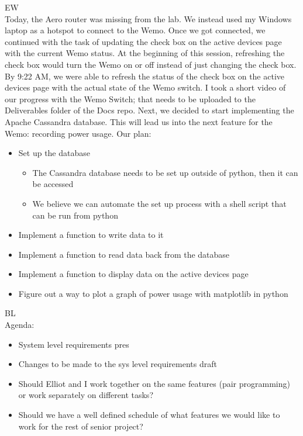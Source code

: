 \documentclass[fontsize=11pt, %
                             paper=letter, %
                             openany, %
                             captions=tableheading,
                             index=totoc,
                             hyperref]{labbook}
\begin{document}
EW\\
Today, the Aero router was missing from the lab. We instead used my Windows laptop as a hotspot to connect to the Wemo. Once we got connected, we continued with the task of updating the check box on the active devices page with the current Wemo status. At the beginning of this session, refreshing the check box would turn the Wemo on or off instead of just changing the check box. By 9:22 AM, we were able to refresh the status of the check box on the active devices page with the actual state of the Wemo switch. I took a short video of our progress with the Wemo Switch; that needs to be uploaded to the Deliverables folder of the Docs repo.
Next, we decided to start implementing the Apache Cassandra database. This will lead us into the next feature for the Wemo: recording power usage. 
Our plan:
\begin{itemize}
\item Set up the database
	\begin{itemize}
	\item The Cassandra database needs to be set up outside of python, then it can be accessed
	\item We believe we can automate the set up process with a shell script that can be run from python
	\end{itemize}
\item Implement a function to write data to it 
\item Implement a function to read data back from the database
\item Implement a function to display data on the active devices page
\item Figure out a way to plot a graph of power usage with matplotlib in python
\end{itemize}

BL\\
Agenda:
\begin{itemize}
\item System level requirements pres
\item Changes to be made to the sys level requirements draft
\item Should Elliot and I work together on the same features (pair programming) or work separately on different tasks?
\item Should we have a well defined schedule of what features we would like to work for the rest of senior project?
\end{itemize}
\end{document}
